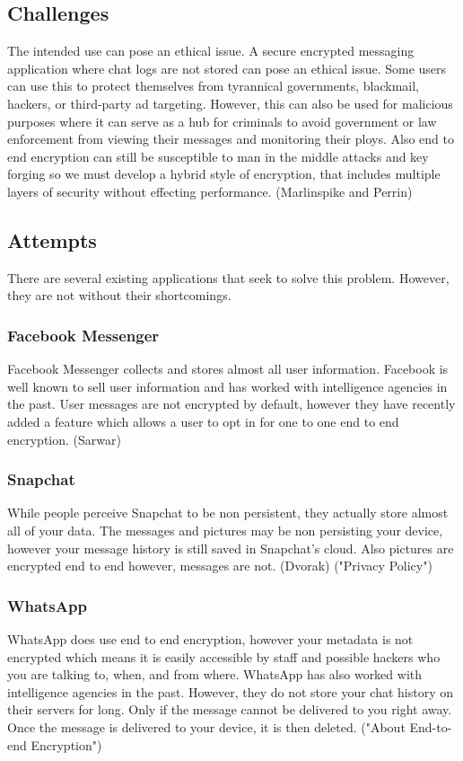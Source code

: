 \documentclass[11pt]{article}
\theoremstyle{plain}
\theoremstyle{definition}
\begin{document}
\subsection{Challenges}\label{sec:challenges}
The intended use can pose an ethical issue. A secure encrypted messaging application where chat logs are not stored can pose an ethical issue. Some users can use this to protect themselves from tyrannical governments, blackmail, hackers, or third-party ad targeting. However, this can also be used for malicious purposes where it can serve as a hub for criminals to avoid government or law enforcement from viewing their messages and monitoring their ploys. Also end to end encryption can still be susceptible to man in the middle attacks and key forging so we must develop a hybrid style of encryption, that includes multiple layers of security without effecting performance. (Marlinspike and Perrin)

\subsection{Attempts}\label{sec:attempts}
There are several existing applications that seek to solve this problem. However, they are not without their shortcomings.
\subsubsection{Facebook Messenger}
Facebook Messenger collects and stores almost all user information. Facebook is well known to sell user information and has worked with intelligence agencies in the past. User messages are not encrypted by default, however they have recently added a feature which allows a user to opt in for one to one end to end encryption. (Sarwar)
\subsubsection{Snapchat}
While people perceive Snapchat to be non persistent, they actually store almost all of your data. The messages and pictures may be non persisting your device, however your message history is still saved in Snapchat's cloud. Also pictures are encrypted end to end however, messages are not.
(Dvorak) ("Privacy Policy")
\subsubsection{WhatsApp}
WhatsApp does use end to end encryption, however your metadata is not encrypted which means it is easily accessible by staff and possible hackers who you are talking to, when, and from where. WhatsApp has also worked with intelligence agencies in the past. However, they do not store your chat history on their servers for long. Only if the message cannot be delivered to you right away. Once the message is delivered to your device, it is then deleted. ("About End-to-end Encryption")
\end{document}
